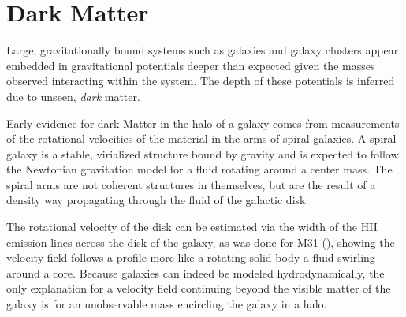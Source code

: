 \documentclass{paper}
\begin{document}

\section*{Dark Matter}
  Large, gravitationally bound systems such as galaxies and galaxy clusters 
  appear embedded in gravitational potentials deeper than expected given 
  the masses observed interacting within the system. The depth of these 
  potentials is inferred due to unseen, \textit{dark} matter.

  Early evidence for dark Matter in the halo of a galaxy comes from
  measurements of the rotational velocities of the material in the arms of
  spiral galaxies. A spiral galaxy is a stable, virialized structure bound by
  gravity and is expected to follow the Newtonian gravitation model for a
  fluid rotating around a center mass. The spiral arms are not coherent
  structures in themselves, but are the result of a density way propagating 
  through the fluid of the galactic disk. 

  The rotational velocity of the disk can be estimated via the 
  width of the HII emission lines across the disk of the galaxy, as was done
  for M31 (\cite{1970ApJ...159..379R}), showing the velocity field follows a 
  profile more like a rotating solid body a fluid 
  swirling around a core. Because galaxies can indeed be modeled 
  hydrodynamically, the only explanation for a velocity field continuing 
  beyond the visible matter of the galaxy is for an unobservable mass 
  encircling the galaxy in a halo.
\end{document}
